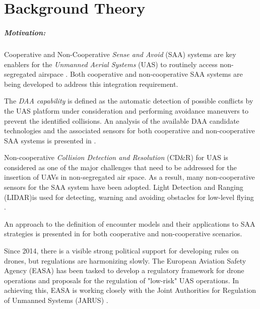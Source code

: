 \cleardoublepage
\chapter{Background Theory}\label{ch:backGroundTheory}

\paragraph{Motivation:} Cooperative and Non-Cooperative \emph{Sense and Avoid} (SAA) systems are key enablers for the \emph{Unmanned Aerial Systems} (UAS) to routinely access non-segregated airspace \cite{spriesterbach2013unmanned}. Both cooperative and non-cooperative SAA systems are being developed to address this integration requirement.

The \emph{DAA capability} is defined as the automatic detection of possible conflicts by the UAS platform under consideration and performing avoidance maneuvers to prevent the identified collisions. An analysis of the available DAA candidate technologies and the associated sensors for both cooperative and non-cooperative SAA systems is presented in \cite{muraru2011critical}. 

Non-cooperative \emph{Collision Detection and Resolution} (CD\&R) for UAS is considered as one of the major challenges that need to be addressed \cite{lai2012see} for the insertion of UAVs in non-segregated air space. As a result, many non-cooperative sensors for the SAA system have been adopted. Light Detection and Ranging (LIDAR)is used for detecting, warning and avoiding obstacles for low-level flying \cite{sabatini2014lidar}.

An approach to the definition of encounter models and their applications to SAA strategies is presented in \cite{kochenderfer2008encounter} for both cooperative and non-cooperative scenarios.

Since 2014, there is a visible strong political support for developing rules on drones, but regulations are harmonizing slowly. The European Aviation Safety Agency (EASA) has been tasked to develop a regulatory framework for drone operations and proposals for the regulation of "low-risk" UAS operations. In achieving this, EASA is working closely with the Joint Authorities for Regulation of Unmanned Systems (JARUS) \cite{jarus2016regulations}.

